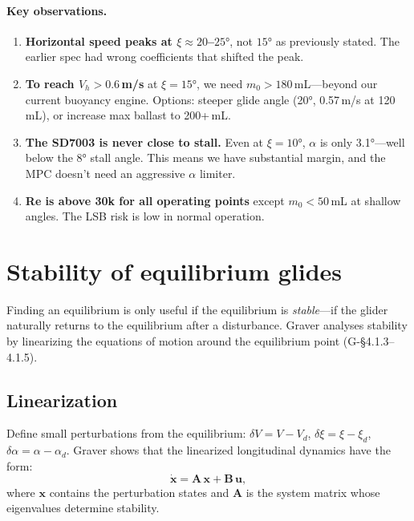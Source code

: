 \documentclass[11pt,a4paper]{article}
\newcommand{\vect}[1]{\bm{#1}}
\newcommand{\mat}[1]{\mathbf{#1}}
\begin{document}
\paragraph{Key observations.}
\begin{enumerate}[nosep]
  \item \textbf{Horizontal speed peaks at $\xi\approx20$--$25°$}, not $15°$ as
    previously stated.  The earlier spec had wrong coefficients that shifted the peak.
  \item \textbf{To reach $V_h>0.6$\,m/s} at $\xi=15°$, we need $m_0>180$\,mL---beyond
    our current buoyancy engine.  Options: steeper glide angle (20°, 0.57\,m/s at 120\,mL),
    or increase max ballast to 200+\,mL.
  \item \textbf{The SD7003 is never close to stall.}  Even at $\xi=10°$, $\alpha$
    is only 3.1°---well below the 8° stall angle.  This means we have substantial margin,
    and the MPC doesn't need an aggressive $\alpha$ limiter.
  \item \textbf{Re is above 30k for all operating points} except $m_0<50$\,mL at shallow
    angles.  The LSB risk is low in normal operation.
\end{enumerate}


\section{Stability of equilibrium glides}
\label{sec:stability}

Finding an equilibrium is only useful if the equilibrium is \emph{stable}---if the
glider naturally returns to the equilibrium after a disturbance.  Graver analyses
stability by linearizing the equations of motion around the equilibrium point
(G-\S4.1.3--4.1.5).

\subsection{Linearization}

Define small perturbations from the equilibrium: $\delta V = V - V_d$,
$\delta\xi = \xi - \xi_d$, $\delta\alpha = \alpha - \alpha_d$.  Graver shows that
the linearized longitudinal dynamics have the form:
\begin{equation}
  \dot{\vect{x}} = \mat{A}\,\vect{x} + \mat{B}\,\vect{u},
  \label{eq:linear}
\end{equation}
where $\vect{x}$ contains the perturbation states and $\mat{A}$ is the system matrix
whose eigenvalues determine stability.
\end{document}
